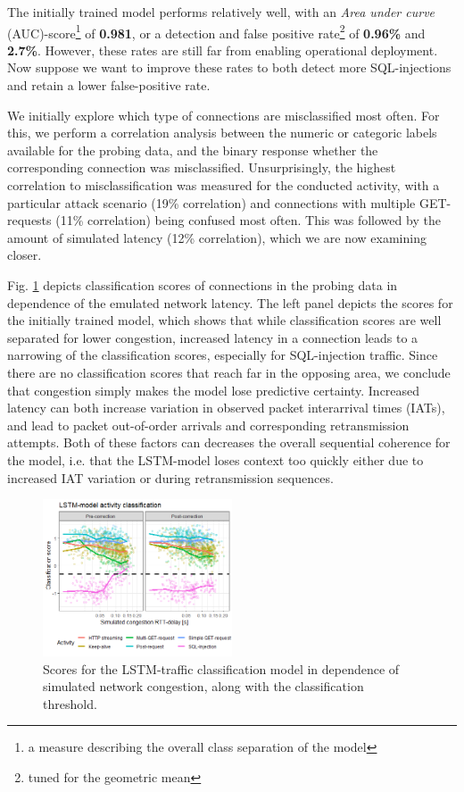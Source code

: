 \documentclass[runningheads]{llncs}
\begin{document}
The initially trained model performs relatively well, with an \textit{Area under curve} (AUC)-score\footnote{a measure describing the overall class separation of the model} of \textbf{0.981}, or a detection and false positive rate\footnote{tuned for the geometric mean} of \textbf{0.96\%} and \textbf{2.7\%}. However, these rates are still far from enabling operational deployment. Now suppose we want to improve these rates to both detect more SQL-injections and retain a lower false-positive rate.

We initially explore which type of connections are misclassified most often. For this, we perform a correlation analysis between the numeric or categoric labels available for the probing data, and the binary response whether the corresponding connection was misclassified. Unsurprisingly, the highest correlation to misclassification was measured for the conducted activity, with a particular attack scenario (19\% correlation) and connections with multiple GET-requests (11\% correlation) being confused most often. This was followed by the amount of simulated latency (12\% correlation), which we are now examining closer.



Fig. \ref{fig:LSTM_exp} depicts classification scores of connections in the probing data in dependence of the emulated network latency. The left panel depicts the scores for the initially trained model, which shows that while classification scores are well separated for lower congestion, increased latency in a connection leads to a narrowing of the classification scores, especially for SQL-injection traffic. Since there are no classification scores that reach far in the opposing area, we conclude that congestion simply makes the model lose predictive certainty. 
Increased latency can both increase variation in observed packet interarrival times (IATs), and lead to packet out-of-order arrivals and corresponding retransmission attempts. Both of these factors can decreases the overall sequential coherence for the model, i.e. that the LSTM-model loses context too quickly either due to increased IAT variation or during retransmission sequences. 


\begin{figure}
\centering
\includegraphics[width=0.5\textwidth]{images/LSTM_classi.png}
\caption{Scores for the LSTM-traffic classification model in dependence of simulated network congestion, along with the classification threshold. }\label{fig:LSTM_exp}
\end{figure}
\end{document}
